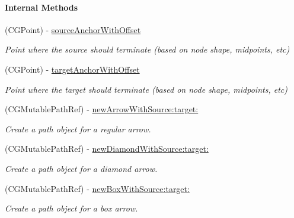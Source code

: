 \begin{Indent}\paragraph*{Internal Methods}
\begin{DoxyCompactItemize}
\item 
\hypertarget{interface_p_c_graph_edge_ac43eb18dd7c76162ffe545e0b053f16e}{
(CGPoint) -\/ \hyperlink{interface_p_c_graph_edge_ac43eb18dd7c76162ffe545e0b053f16e}{sourceAnchorWithOffset}}
\label{interface_p_c_graph_edge_ac43eb18dd7c76162ffe545e0b053f16e}

\begin{DoxyCompactList}\small\item\em Point where the source should terminate (based on node shape, midpoints, etc) \end{DoxyCompactList}\item 
\hypertarget{interface_p_c_graph_edge_a495510c66fb87486eddbc7c110d57257}{
(CGPoint) -\/ \hyperlink{interface_p_c_graph_edge_a495510c66fb87486eddbc7c110d57257}{targetAnchorWithOffset}}
\label{interface_p_c_graph_edge_a495510c66fb87486eddbc7c110d57257}

\begin{DoxyCompactList}\small\item\em Point where the target should terminate (based on node shape, midpoints, etc) \end{DoxyCompactList}\item 
\hypertarget{interface_p_c_graph_edge_a4035a9053d4ff8e7f62099f17260ab08}{
(CGMutablePathRef) -\/ \hyperlink{interface_p_c_graph_edge_a4035a9053d4ff8e7f62099f17260ab08}{newArrowWithSource:target:}}
\label{interface_p_c_graph_edge_a4035a9053d4ff8e7f62099f17260ab08}

\begin{DoxyCompactList}\small\item\em Create a path object for a regular arrow. \end{DoxyCompactList}\item 
\hypertarget{interface_p_c_graph_edge_a2011cf73099c62c4f38753593f2557bb}{
(CGMutablePathRef) -\/ \hyperlink{interface_p_c_graph_edge_a2011cf73099c62c4f38753593f2557bb}{newDiamondWithSource:target:}}
\label{interface_p_c_graph_edge_a2011cf73099c62c4f38753593f2557bb}

\begin{DoxyCompactList}\small\item\em Create a path object for a diamond arrow. \end{DoxyCompactList}\item 
\hypertarget{interface_p_c_graph_edge_a7cea6a929b7eb54e0bbacd8f22e8f566}{
(CGMutablePathRef) -\/ \hyperlink{interface_p_c_graph_edge_a7cea6a929b7eb54e0bbacd8f22e8f566}{newBoxWithSource:target:}}
\label{interface_p_c_graph_edge_a7cea6a929b7eb54e0bbacd8f22e8f566}

\begin{DoxyCompactList}\small\item\em Create a path object for a box arrow. \end{DoxyCompactList}\end{DoxyCompactItemize}
\end{Indent}
